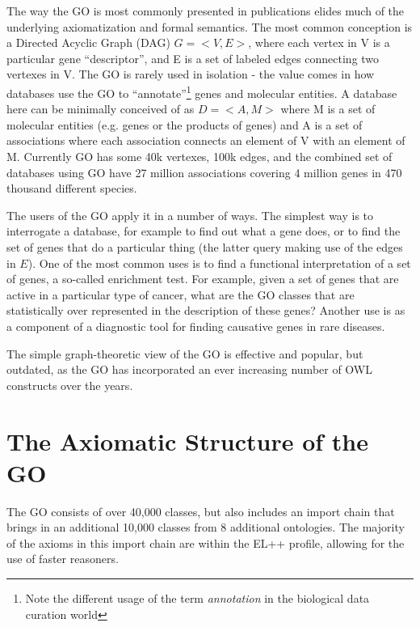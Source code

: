 \documentclass{llncs}
\begin{document}
The way the GO is most commonly presented in publications elides much
of the underlying axiomatization and formal semantics. The most common
conception is a Directed Acyclic Graph (DAG) $G = <V,E>$, where each
vertex in V is a particular gene ``descriptor'', and E is a set of
labeled edges connecting two vertexes in V. The GO is rarely used in
isolation - the value comes in how databases use the GO to
``annotate''\footnote{Note the different usage of the term
  \emph{annotation} in the biological data curation world} genes and
molecular entities.  A database here can be minimally conceived of as
$D = <A, M>$ where M is a set of molecular entities (e.g. genes or the
products of genes) and A is a set of associations where each
association connects an element of V with an element of M. Currently
GO has some 40k vertexes, 100k edges, and the combined set of
databases using GO have 27 million associations covering 4 million
genes in 470 thousand different species\cite{Blake2013}.

The users of the GO apply it in a number of ways. The simplest way is
to interrogate a database, for example to find out what a gene does,
or to find the set of genes that do a particular thing (the latter
query making use of the edges in $E$). One of the most common uses is
to find a functional interpretation of a set of genes, a so-called
enrichment test. For example, given a set of genes that are active in
a particular type of cancer, what are the GO classes that are
statistically over represented in the description of these
genes? Another use is as a component of a diagnostic tool for finding
causative genes in rare diseases\cite{Singleton2014}.

The simple graph-theoretic view of the GO is effective and popular,
but outdated, as the GO has incorporated an ever increasing number of
OWL constructs over the years. 

\section{The Axiomatic Structure of the GO}


The GO consists of over 40,000 classes, but also includes an import
chain that brings in an additional 10,000 classes from 8 additional
ontologies. The majority of the axioms in this import chain are within
the EL++ profile, allowing for the use of faster reasoners.
\end{document}
